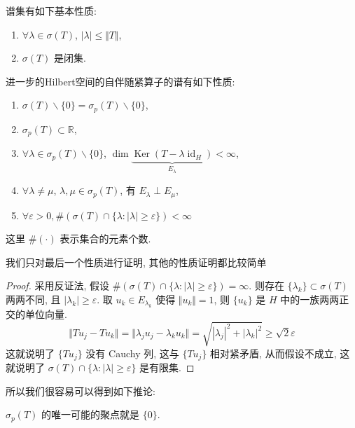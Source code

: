 \documentclass[11pt]{ctexart}[UTF8]
\begin{document}
谱集有如下基本性质:
\begin{proposition}\leavevmode
    \begin{enumerate}
        \item $\forall \lambda \in \sigma(T)$, $|\lambda| \leq \Vert T \Vert$, 
        \item $\sigma(T)$ 是闭集.
    \end{enumerate}
\end{proposition}
进一步的Hilbert空间的自伴随紧算子的谱有如下性质:
\begin{property}\leavevmode
    \begin{enumerate}
        \item $\sigma(T)\backslash\{0\} = \sigma_{p}(T)\backslash\{0\}$,
        \item $\sigma_{p}(T) \subset \mathbb{R}$,
        \item $\forall \lambda \in \sigma_{p}(T)\backslash\{0\}$, $\dim \underbrace{\operatorname{Ker}(T-\lambda \operatorname{id}_{H})}_{E_{\lambda}} < \infty$,
        \item $\forall \lambda \neq \mu$, $\lambda, \mu \in \sigma_{p}(T)$, 有 $E_{\lambda} \perp E_{\mu}$,
        \item $\forall \varepsilon > 0, \# (\sigma(T) \cap \{ \lambda : |\lambda| \geq \varepsilon \}) < \infty$
    \end{enumerate}    
\end{property}
\begin{remark}
    这里 $\# (\cdot)$ 表示集合的元素个数.
\end{remark}
我们只对最后一个性质进行证明, 其他的性质证明都比较简单
\begin{proof}
    采用反证法, 假设 $\# (\sigma(T) \cap \{ \lambda : |\lambda| \geq \varepsilon \}) = \infty$. 则存在 $\{ \lambda_{k} \} \subset \sigma(T)$ 两两不同, 且 $|\lambda_{k}| \geq \varepsilon$. 
    取 $u_{k} \in E_{\lambda_{k}}$ 使得 $\Vert u_{k} \Vert = 1$, 则 $\{ u_{k} \}$ 是 $H$ 中的一族两两正交的单位向量.
    \begin{equation*}
        \Vert T u_{j}- T u_{k} \Vert = \Vert \lambda_{j} u_{j} - \lambda_{k} u_{k} \Vert = \sqrt{|\lambda_{j}|^2 + |\lambda_{k}|^2} \geq \sqrt{2}\varepsilon
    \end{equation*} 
    这就说明了 $\{ Tu_{j} \}$ 没有 Cauchy 列, 这与 $\{ T u_{j} \}$ 相对紧矛盾, 从而假设不成立, 这就说明了 $\sigma(T) \cap \{ \lambda : |\lambda| \geq \varepsilon \}$ 是有限集.
\end{proof}
所以我们很容易可以得到如下推论:
\begin{corollary}
    $\sigma_{p}(T)$ 的唯一可能的聚点就是 $\{ 0 \}$.
\end{corollary}
\end{document}

